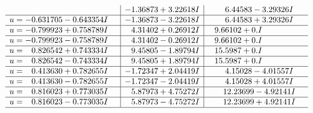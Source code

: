 \documentclass[1p]{elsarticle_modified}
\theoremstyle{definition}
\begin{document}
$$\begin{array}{c|c|c}
 & -1.36873 + 3.22618 I & \phantom{-}6.44583 - 3.29326 I \\ \hline\begin{aligned}
u &= -0.631705 - 0.643354 I\end{aligned}
 & -1.36873 - 3.22618 I & \phantom{-}6.44583 + 3.29326 I \\ \hline\begin{aligned}
u &= -0.799923 + 0.758789 I\end{aligned}
 & \phantom{-}4.31402 + 0.26912 I & \phantom{-}9.66102 + 0. I\phantom{ +0.000000I} \\ \hline\begin{aligned}
u &= -0.799923 - 0.758789 I\end{aligned}
 & \phantom{-}4.31402 - 0.26912 I & \phantom{-}9.66102 + 0. I\phantom{ +0.000000I} \\ \hline\begin{aligned}
u &= \phantom{-}0.826542 + 0.743334 I\end{aligned}
 & \phantom{-}9.45805 - 1.89794 I & \phantom{-}15.5987 + 0. I\phantom{ +0.000000I} \\ \hline\begin{aligned}
u &= \phantom{-}0.826542 - 0.743334 I\end{aligned}
 & \phantom{-}9.45805 + 1.89794 I & \phantom{-}15.5987 + 0. I\phantom{ +0.000000I} \\ \hline\begin{aligned}
u &= \phantom{-}0.413630 + 0.782655 I\end{aligned}
 & -1.72347 + 2.04419 I & \phantom{-}4.15028 - 4.01557 I \\ \hline\begin{aligned}
u &= \phantom{-}0.413630 - 0.782655 I\end{aligned}
 & -1.72347 - 2.04419 I & \phantom{-}4.15028 + 4.01557 I \\ \hline\begin{aligned}
u &= \phantom{-}0.816023 + 0.773035 I\end{aligned}
 & \phantom{-}5.87973 + 4.75272 I & \phantom{-}12.23699 - 4.92141 I \\ \hline\begin{aligned}
u &= \phantom{-}0.816023 - 0.773035 I\end{aligned}
 & \phantom{-}5.87973 - 4.75272 I & \phantom{-}12.23699 + 4.92141 I\\
 \hline 
 \end{array}$$\newpage$$\begin{array}{c|c|c}  

\end{array}$$
\end{document}
